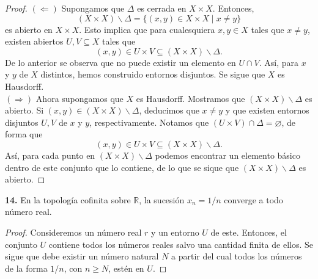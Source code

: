 \documentclass{article}
\begin{document}
\begin{proof}
	$(\Leftarrow)$ Supongamos que $\Delta$ es cerrada en $X \times X$. Entonces, 
	$$ \left( X \times X \right)  \backslash \Delta = \{ (x, y) \in X \times X \mid x \neq y \}$$ 
es abierto en $X \times X$. Esto implica que para cualesquiera $x, y \in X$ tales que $x \neq y$, existen abiertos $U, V \subseteq X$ tales que
$$ (x, y) \in U \times V \subseteq  \left( X \times X \right)  \backslash \Delta. $$
De lo anterior se observa que no puede existir un elemento en $U \cap V$. Así, para $x$ y $y$ de $X$ distintos, hemos construido entornos disjuntos. Se sigue que $X$ es Hausdorff.\\
$(\Rightarrow)$ Ahora supongamos que $X$ es Hausdorff. Mostramos que $\left( X \times X \right)  \backslash \Delta$ es abierto. Si $(x, y) \in \left( X \times X \right)  \backslash \Delta$, deducimos que $x \neq y$ y que existen entornos disjuntos $U, V$ de $x$ y $y$, respectivamente. Notamos que $ (U \times V) \cap \Delta = \varnothing$, de forma que 
$$(x, y) \in U \times V \subseteq \left( X \times X \right)  \backslash \Delta.$$ 
Así, para cada punto en $\left( X \times X \right)  \backslash \Delta$ podemos encontrar un elemento básico dentro de este conjunto que lo contiene, de lo que se sique que $\left( X \times X \right)  \backslash \Delta$ es abierto. 
\end{proof}

\begin{mybox}
	\textbf{14. } En la topología cofinita sobre $\mathbb{R}$, la sucesión $x_{n} = 1/n$ converge a todo número real. 
\end{mybox}	
\begin{proof}
	Consideremos un número real $r$ y un entorno $U$ de este. Entonces, el conjunto $U$ contiene todos los números reales salvo una cantidad finita de ellos. Se sigue que debe existir un número natural $N$ a partir del cual todos los números de la forma $1/n$, con $n \geq N$, estén en $U$.  
\end{proof}
\end{document}
